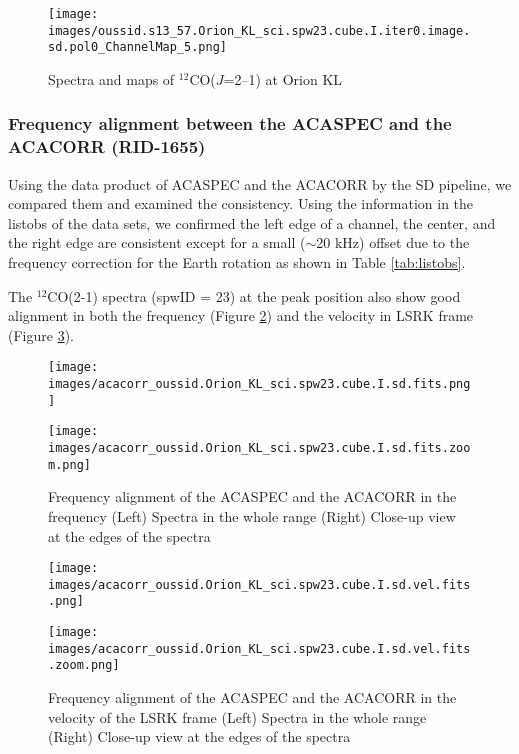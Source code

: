 \begin{figure}[htbp]
     \centering
     \texttt{[image: images/oussid.s13\_57.Orion\_KL\_sci.spw23.cube.I.iter0.image.sd.pol0\_ChannelMap\_5.png]}
     \caption{Spectra and maps of $^{12}$CO($J$=2--1) at Orion KL}
     \label{fig:SDpipeline2}
\end{figure}


\subsubsection{Frequency alignment between the ACASPEC and the ACACORR (RID-1655)}
Using the data product of ACASPEC and the ACACORR by the SD pipeline, we compared them and examined the consistency. Using the information in the listobs of the data sets, we confirmed the left edge of a channel, the center, and the right edge are consistent except for a small ($\sim$20 kHz) offset due to the frequency correction for the Earth rotation as shown in Table \ref{tab:listobs}.

The $^{12}$CO(2-1) spectra (spwID = 23) at the peak position also show good alignment in both the frequency (Figure \ref{fig:alignment_frequency}) and the velocity in LSRK frame (Figure \ref{fig:alignment_velocity}).

\begin{figure}[htbp]
  \begin{minipage}[b]{0.48\linewidth}
    \centering
    \texttt{[image: images/acacorr\_oussid.Orion\_KL\_sci.spw23.cube.I.sd.fits.png]}
  \end{minipage}
  \begin{minipage}[b]{0.48\linewidth}
    \centering
    \texttt{[image: images/acacorr\_oussid.Orion\_KL\_sci.spw23.cube.I.sd.fits.zoom.png]}
  \end{minipage}
    \caption{Frequency alignment of the ACASPEC and the ACACORR in the frequency (Left) Spectra in the whole range  (Right) Close-up view at the edges of the spectra}
    \label{fig:alignment_frequency}
\end{figure}

\begin{figure}[htbp]
  \begin{minipage}[b]{0.48\linewidth}
    \centering
    \texttt{[image: images/acacorr\_oussid.Orion\_KL\_sci.spw23.cube.I.sd.vel.fits.png]}
  \end{minipage}
  \begin{minipage}[b]{0.48\linewidth}
    \centering
    \texttt{[image: images/acacorr\_oussid.Orion\_KL\_sci.spw23.cube.I.sd.vel.fits.zoom.png]}
  \end{minipage}
    \caption{Frequency alignment of the ACASPEC and the ACACORR in the velocity of the LSRK frame (Left) Spectra in the whole range  (Right) Close-up view at the edges of the spectra}
    \label{fig:alignment_velocity}
\end{figure}


